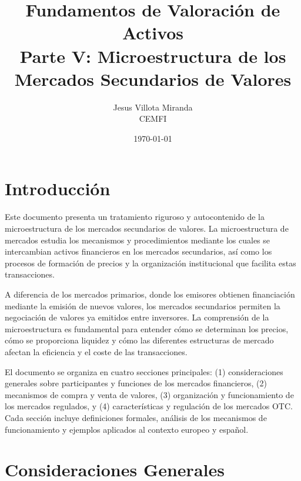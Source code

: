 

\title{\textbf{Fundamentos de Valoración de Activos}\\
\large Parte V: Microestructura de los Mercados Secundarios de Valores}
\author{Jesus Villota Miranda\\
CEMFI}
\date{\today}



\maketitle

\tableofcontents
\newpage

\section{Introducción}

Este documento presenta un tratamiento riguroso y autocontenido de la microestructura de los mercados secundarios de valores. La microestructura de mercados estudia los mecanismos y procedimientos mediante los cuales se intercambian activos financieros en los mercados secundarios, así como los procesos de formación de precios y la organización institucional que facilita estas transacciones.

A diferencia de los mercados primarios, donde los emisores obtienen financiación mediante la emisión de nuevos valores, los mercados secundarios permiten la negociación de valores ya emitidos entre inversores. La comprensión de la microestructura es fundamental para entender cómo se determinan los precios, cómo se proporciona liquidez y cómo las diferentes estructuras de mercado afectan la eficiencia y el coste de las transacciones.

El documento se organiza en cuatro secciones principales: (1) consideraciones generales sobre participantes y funciones de los mercados financieros, (2) mecanismos de compra y venta de valores, (3) organización y funcionamiento de los mercados regulados, y (4) características y regulación de los mercados OTC. Cada sección incluye definiciones formales, análisis de los mecanismos de funcionamiento y ejemplos aplicados al contexto europeo y español.

\section{Consideraciones Generales}
\label{sec:consideraciones}

